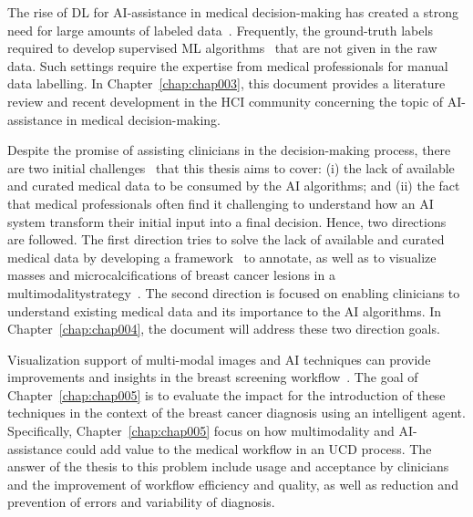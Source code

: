 The rise of \ac{DL} for \ac{AI}-assistance in medical decision-making has created a strong need for large amounts of labeled data~\cite{10.1145/3313831.3376290}.
Frequently, the ground-truth labels required to develop supervised \ac{ML} algorithms~\cite{Yue_2020_CVPR} that are not given in the raw data.
Such settings require the expertise from medical professionals for manual data labelling.
In Chapter~\ref{chap:chap003}, this document provides a literature review and recent development in the \ac{HCI} community concerning the topic of \ac{AI}-assistance in medical decision-making.

\clearpage

Despite the promise of assisting clinicians in the decision-making process, there are two initial challenges~\cite{hugo2020si} that this thesis aims to cover: (i) the lack of available and curated medical data to be consumed by the \ac{AI} algorithms; and (ii) the fact that medical professionals often find it challenging to understand how an \ac{AI} system transform their initial input into a final decision.
Hence, two directions are followed.
The first direction tries to solve the lack of available and curated medical data by developing a framework~\cite{https://doi.org/10.13140/rg.2.2.16086.88649, calisto2019midaaiarfuv} to annotate, as well as to visualize masses and microcalcifications of breast cancer lesions in a multimodality\footnotemark[3] strategy~\cite{https://doi.org/10.13140/rg.2.2.14792.55049}.
The second direction is focused on enabling clinicians to understand existing medical data and its importance to the \ac{AI} algorithms.
In Chapter~\ref{chap:chap004}, the document will address these two direction goals.


Visualization support of multi-modal images and \ac{AI} techniques can provide improvements and insights in the breast screening workflow~\cite{https://doi.org/10.13140/rg.2.2.25412.68486}.
The goal of Chapter~\ref{chap:chap005} is to evaluate the impact for the introduction of these techniques in the context of the breast cancer diagnosis using an intelligent agent.
Specifically, Chapter~\ref{chap:chap005} focus on how multimodality and \ac{AI}-assistance could add value to the medical workflow in an \ac{UCD} process.
The answer of the thesis to this problem include usage and acceptance by clinicians and the improvement of workflow efficiency and quality, as well as reduction and prevention of errors and variability of diagnosis.

